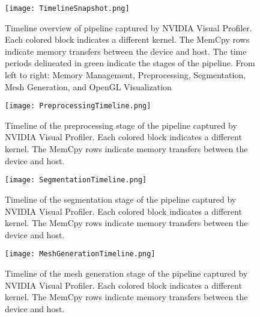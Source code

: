 \begin{figure}[!htpb]
    \centering
    \texttt{[image: TimelineSnapshot.png]}
    \caption{Timeline overview of pipeline captured by NVIDIA Visual Profiler. Each colored block indicates a different kernel. The MemCpy rows indicate memory transfers between the device and host. The time periods delineated in green indicate the stages of the pipeline. From left to right: Memory Management, Preprocessing, Segmentation, Mesh Generation, and OpenGL Visualization}
    \label{fig:fulltimeline}
\end{figure}


\begin{figure}[!htpb]
    \centering
    \texttt{[image: PreprocessingTimeline.png]}
    \caption{Timeline of the preprocessing stage of the pipeline captured by NVIDIA Visual Profiler. Each colored block indicates a different kernel. The MemCpy rows indicate memory transfers between the device and host.}
    \label{fig:preprocessingtimeline}
\end{figure}


\begin{figure}[!htpb]
    \centering
    \texttt{[image: SegmentationTimeline.png]}
    \caption{Timeline of the segmentation stage of the pipeline captured by NVIDIA Visual Profiler. Each colored block indicates a different kernel. The MemCpy rows indicate memory transfers between the device and host.}
    \label{fig:segmentationtimeline}
\end{figure}

\begin{figure}[!htpb]
    \centering
    \texttt{[image: MeshGenerationTimeline.png]}
    \caption{Timeline of the mesh generation stage of the pipeline captured by NVIDIA Visual Profiler. Each colored block indicates a different kernel. The MemCpy rows indicate memory transfers between the device and host.}
    \label{fig:meshgenerationtimeline}
\end{figure}

